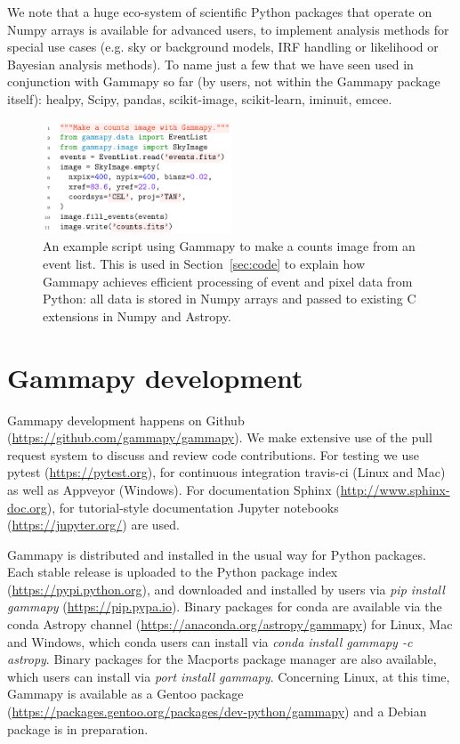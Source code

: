 \documentclass{PoS}
\newcommand{\url}[1]{\href{#1}{#1}}
\begin{document}
We note that a huge eco-system of scientific Python packages that operate on Numpy arrays is available for advanced users, to implement analysis methods for special use cases (e.g. sky or background models, IRF handling or likelihood or Bayesian analysis methods). To name just a few that we have seen used in conjunction with Gammapy so far (by users, not within the Gammapy package itself): healpy, Scipy, pandas, scikit-image, scikit-learn, iminuit, emcee.

\begin{figure}[t]
\centering
\includegraphics[width=0.5\textwidth]{examples/code_events_image}
\caption{
An example script using Gammapy to make a counts image from an event list. This
is used in Section~\ref{sec:code} to explain how Gammapy achieves efficient
processing of event and pixel data from Python: all data is stored in Numpy
arrays and passed to existing C extensions in Numpy and Astropy.
}
\label{fig:code_example}
\end{figure}

\section{Gammapy development}

Gammapy development happens on Github
(\url{https://github.com/gammapy/gammapy}). We make extensive use of the pull
request system to discuss and review code contributions. For testing we use
pytest (\url{https://pytest.org}), for continuous integration travis-ci (Linux
and Mac) as well as Appveyor (Windows). For documentation Sphinx
(\url{http://www.sphinx-doc.org}), for tutorial-style documentation Jupyter
notebooks (\url{https://jupyter.org/}) are used.

Gammapy is distributed and installed in the usual way for Python packages. Each
stable release is uploaded to the Python package index
(\url{https://pypi.python.org}), and downloaded and installed by users via {\it
pip install gammapy} (\url{https://pip.pypa.io}). Binary packages for conda are
available via the conda Astropy channel
(\url{https://anaconda.org/astropy/gammapy}) for Linux, Mac and Windows, which
conda users can install via {\it conda install gammapy -c astropy}. Binary
packages for the Macports package manager are also available, which users can
install via {\it port install gammapy}. Concerning Linux, at this time, Gammapy
is available as a Gentoo package
(\url{https://packages.gentoo.org/packages/dev-python/gammapy}) and a Debian
package is in preparation.
\end{document}
